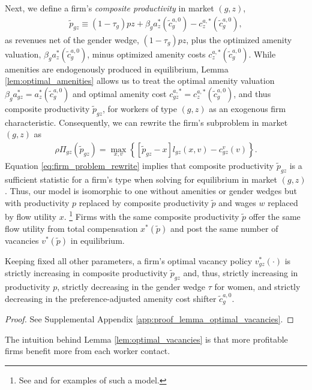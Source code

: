 Next, we define a firm's \emph{composite productivity} in market $(g, z)$,
%
\begin{align}
    \tilde{p}_{gz} \equiv (1 - \tau_{g}) p z + \beta_{g} a_{z}^{*}(\tilde{c}_{g}^{a,0}) - c_{z}^{a,*}(\tilde{c}_{g}^{a,0}), \label{eq:composite_prod}
\end{align}
%
as revenues net of the gender wedge, $(1 - \tau_{g}) p z$, plus the optimized amenity valuation, $\beta_{g} a_{z}^{*}(\tilde{c}_{g}^{a,0})$, minus optimized amenity costs $c_{z}^{a,*}(\tilde{c}_{g}^{a,0})$. %
%
While amenities are endogenously produced in equilibrium, Lemma \ref{lem:optimal_amenities} allows us to treat the optimal amenity valuation $\beta_{g} a_{gz}^{*} = a_{z}^{*}(\tilde{c}_{g}^{a,0})$ and optimal amenity cost $c_{gz}^{a,*} = c_{z}^{a,*}(\tilde{c}_{g}^{a,0})$, and thus composite productivity $\tilde{p}_{gz}$, for workers of type $(g, z)$ as an exogenous firm characteristic. Consequently, we can rewrite the firm's subproblem in market $(g, z)$ as
%
\begin{align}
    \rho \Pi_{gz}(\tilde{p}_{gz}) = \max_{x, v} \left\{ \left[ \tilde{p}_{gz} - x \right] l_{gz}(x, v) - c_{gz}^{v}(v) \right\}. \label{eq:firm_problem_rewrite}
\end{align}
%
Equation \eqref{eq:firm_problem_rewrite} implies that composite productivity $\tilde{p}_{gz}$ is a sufficient statistic for a firm's type when solving for equilibrium in market $(g, z)$. Thus, our model is isomorphic to one without amenities or gender wedges but with productivity $p$ replaced by composite productivity $\tilde{p}$ and wages $w$ replaced by flow utility $x$.%
%
\footnote{See \citet{Mortensen2003} and \citet{EngbomMoser2022a} for examples of such a model.} %
%
Firms with the same composite productivity $\tilde{p}$ offer the same flow utility from total compensation $x^{*}(\tilde{p})$ and post the same number of vacancies $v^{*}(\tilde{p})$ in equilibrium.

%
\newcommand{\LemmaOptimalVacancies}{%
    Keeping fixed all other parameters, a firm's optimal vacancy policy $v_{gz}^{*}(\cdot)$ is strictly increasing in composite productivity $\tilde{p}_{gz}$ and, thus, strictly increasing in productivity $p$, strictly decreasing in the gender wedge $\tau$ for women, and strictly decreasing in the preference-adjusted amenity cost shifter $\tilde{c}_{g}^{a,0}$.%
}
%
\begin{lemma}
    \label{lem:optimal_vacancies}
    \LemmaOptimalVacancies
\end{lemma}
%
\begin{proof}
    See Supplemental Appendix \ref{app:proof_lemma_optimal_vacancies}.
\end{proof}
%
The intuition behind Lemma \ref{lem:optimal_vacancies} is that more profitable firms benefit more from each worker contact.

